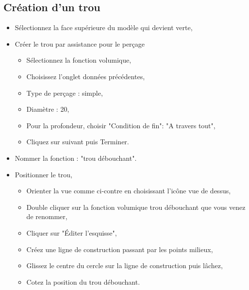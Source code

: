 \subsection{Création d'un trou}

\begin{minipage}{0.75\linewidth}
\begin{itemize}
 \item Sélectionnez la face supérieure du modèle qui devient verte,
 \item Créer le trou par assistance pour le perçage
 \begin{itemize}
  \item Sélectionnez la fonction volumique,
  \item Choisissez l'onglet données précédentes,
  \item Type de perçage : simple,
  \item Diamètre : 20,
  \item Pour la profondeur, choisir "Condition de fin": "A travers tout",
  \item Cliquez sur suivant puis Terminer.
 \end{itemize}
 \item Nommer la fonction : "trou débouchant".
 \item Positionner le trou,
 \begin{itemize}
  \item Orienter la vue comme ci-contre en choisissant l'icône vue de dessus,
  \item Double cliquer sur la fonction volumique trou débouchant que vous venez de renommer,
  \item Cliquer sur "Éditer l'esquisse",
  \item Créez une ligne de construction passant par les points milieux,
  \item Glissez le centre du cercle sur la ligne de construction puis lâchez,
  \item Cotez la position du trou débouchant.
 \end{itemize}
\end{itemize}
\end{minipage}
\hfill
